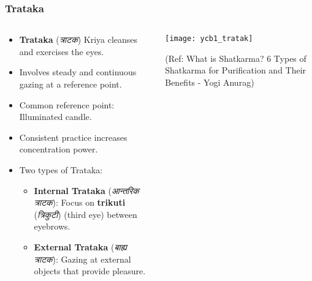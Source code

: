 \begin{frame}[fragile]\frametitle{Trataka}
\begin{columns}
    \begin{column}[T]{0.5\linewidth}
     \begin{itemize}
          \item \textbf{Trataka} (\textit{त्राटक}) Kriya cleanses and exercises the eyes.
          \item Involves steady and continuous gazing at a reference point.
          \item Common reference point: Illuminated candle.
          \item Consistent practice increases concentration power.
          \item Two types of Trataka:
            \begin{itemize}
              \item \textbf{Internal Trataka} (\textit{आन्तरिक त्राटक}): Focus on \textbf{trikuti} (\textit{त्रिकुटी}) (third eye) between eyebrows.
              \item \textbf{External Trataka} (\textit{बाह्य त्राटक}): Gazing at external objects that provide pleasure.
            \end{itemize}
      \end{itemize}
    \end{column}
    \begin{column}[T]{0.5\linewidth}
        \begin{center}
        \texttt{[image: ycb1\_tratak]}
		
		{\tiny (Ref: What is Shatkarma? 6 Types of Shatkarma for Purification and Their Benefits - Yogi Anurag)}	
        \end{center}	
    \end{column}
\end{columns}	  
\end{frame}

